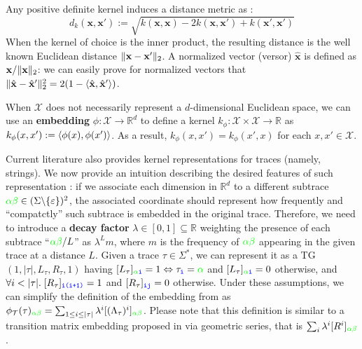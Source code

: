 Any positive definite kernel induces a distance metric as \cite{Raedt}:
\[d_k(\mathbf{x},\mathbf{x}'):=\sqrt{k(\mathbf{x},\mathbf{x})-2k(\mathbf{x},\mathbf{x}')+k(\mathbf{x}',\mathbf{x}')}\] 
When the kernel of choice is the inner product, the resulting distance is the well known Euclidean distance $\|\mathbf{x}-\mathbf{x}'\|_{2}$. A normalized vector (versor) $\hat{\mathbf{x}}$ is defined as $\mathbf{x}/\|\mathbf{x}\|_{2}$: we can easily prove for normalized vectors that $\|\hat{\mathbf{x}}-\hat{\mathbf{x}}'\|_{2}^2=2(1-\Braket{\hat{\mathbf{x}},\hat{\mathbf{x}}'})$.

When $\mathcal{X}$ does not necessarily represent a $d$-dimensional Euclidean space, we can use an \textbf{embedding} $\phi\colon\mathcal{X}\to \mathbb{R}^d$ to define a kernel $k_\phi\colon \mathcal{X}\times \mathcal{X}\to\mathbb{R}$ as $k_\phi(x,x'):=\Braket{\phi(x),\phi(x')}$. As a result, $k_\phi(x,x')=k_\phi(x',x)$ for each $x,x'\in\mathcal{X}$.

Current literature also provides kernel representations for traces (namely, strings). We now provide an intuition describing the desired features of such representation \cite{LodhiSSCW02}: if we associate each dimension in $\mathbb{R}^d$ to a different subtrace ${\color{green}\alpha\beta}\in(\Sigma\backslash\{\varepsilon\})^2$, the associated coordinate should represent how frequently and ``compatctly'' such subtrace is embedded in the original trace. Therefore, we need to introduce a \textbf{decay factor} $\lambda\in[0,1]\subseteq\mathbb{R}$ weighting the presence of each subtrace ``${\color{green}\alpha\beta}/L$'' as $\lambda^Lm$, where $m$ is the frequency of $\color{green}\alpha\beta$ appearing in the given trace at a distance $L$. Given a trace $\tau\in\Sigma^*$, we can represent it as a TG \cite{Myers1989} $(1,{|\tau|},L_\tau,R_\tau,1)$ having $[L_\tau]_{{\color{green}\alpha}\texttt{\color{blue}i}}=1\Leftrightarrow \tau_{\texttt{\color{blue}i}}={\color{green}\alpha}$ and $[L_\tau]_{{\color{green}\alpha}\texttt{\color{blue}i}}=0$ otherwise, and $\forall i<|\tau|.\; [R_\tau]_{\texttt{\color{blue}i(i+1)}}=1 $ and $[R_\tau]_{\texttt{\color{blue}ij}}=0$ otherwise. Under these assumptions, we can simplify the definition of the embedding from \cite{LodhiSSCW02,Raedt} as $\phi_{\mathcal{T}}(\tau)_{{\color{green}\alpha\beta}}=\sum_{1\leq i\leq |\tau|}\lambda^i[(\Lambda_\tau)^i]_{\color{green}\alpha\beta}$. Please note that this definition is similar to a transition matrix embedding proposed in \cite{GartnerFW03} via geometric series, that is $\sum_i\lambda^i[R^i]_{\color{green}\alpha\beta}$. 

